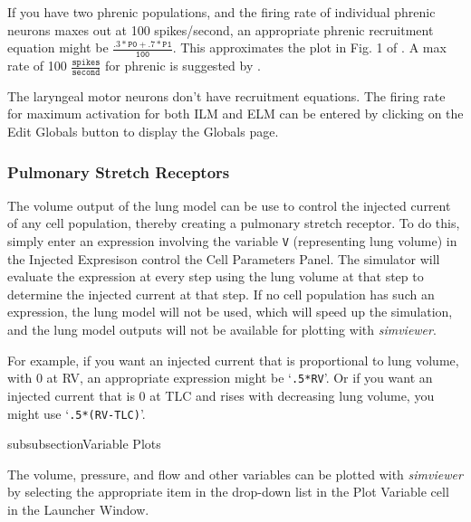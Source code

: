\documentclass[12pt,openany,oneside]{book}
\newcommand{\ticode}[1]{\texttt{#1}}
\newcommand{\tmcode}[1]{\mathtt{#1}}
\newcommand{\tisamp}[1]{`\texttt{#1}'}
\newcommand{\prog}[1]{\textit{{#1}}}
\begin{document}
If you have two phrenic populations, and the firing rate of individual
phrenic neurons maxes out at 100 spikes/second, an appropriate phrenic
recruitment equation might be $\tmcode{\tfrac{.3*P0+.7*P1}{100}}$. This
approximates the plot in Fig. 1 of \citet{Mantilla201157}.
A max rate of 100 $\tmcode{\tfrac{spikes}{second}}$ for phrenic is suggested by
\citet{springerlink:10.1007/BF00235915}.

The laryngeal motor neurons don't have recruitment equations. 
The firing rate for maximum
activation for both ILM and ELM can be entered by clicking
on the Edit Globals button to display the Globals page.

\subsubsection{Pulmonary Stretch Receptors}

The volume output of the lung model can be use to control the injected
current of any cell population, thereby creating a pulmonary stretch
receptor. To do this, simply enter an expression involving the variable
\ticode{V} (representing lung volume) in the Injected Expresison control 
the Cell Parameters Panel. The
simulator will evaluate the expression at every step using the lung
volume at that step to determine the injected current at that step. If
no cell population has such an expression, the lung model will not be
used, which will speed up the simulation, and the lung model outputs
will not be available for plotting with \prog{simviewer}.

For example, if you want an injected current that is proportional to
lung volume, with 0 at RV, an appropriate expression might be
\tisamp{.5*RV}. Or if you want an injected current that is 0 at TLC
and rises with decreasing lung volume, you might use
\tisamp{.5*(RV-TLC)}.


subsubsection{Variable Plots}

The volume, pressure, and flow and other variables can be plotted with
\prog{simviewer} by selecting the appropriate item in the drop-down
list in the Plot Variable cell in the Launcher Window.
\end{document}
